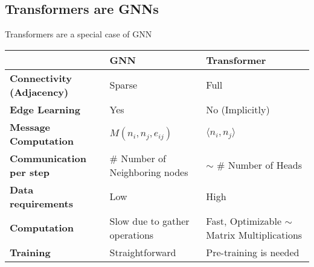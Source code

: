 \subsection{Transformers are GNNs}
\begin{summary} Transformers are a special case of GNN
    \begin{center}
        \begin{tabular}{lll}
            \toprule
            \textbf{} & \textbf{GNN} & \textbf{Transformer} \\
            \midrule
            \textbf{Connectivity (Adjacency)} & Sparse & Full \\
            \textbf{Edge Learning} & Yes & No (Implicitly) \\
            \textbf{Message Computation} & $M(n_i, n_j, e_{ij})$ & $\langle n_i, n_j \rangle$ \\
            \textbf{Communication per step} & \# Number of Neighboring nodes & $\sim$ \# Number of Heads \\
            \textbf{Data requirements} & Low & High \\
            \textbf{Computation} & Slow due to gather operations & Fast, Optimizable $\sim$ Matrix Multiplications \\
            \textbf{Training} & Straightforward & Pre-training is needed \\
            \bottomrule
        \end{tabular}
    \end{center}
\end{summary}
\newpage

